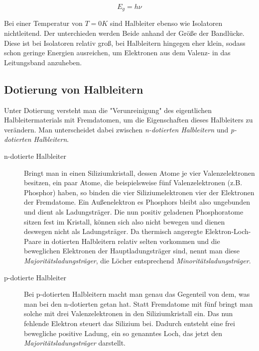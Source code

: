 \documentclass[slug=SZ, room=Hermann-Krone-Bau\,\ Labor\ 1.25,
supervisor=Martin\ Kroll, coursedate=14.\ 11.\ 2019]{../../Lab_Report_LaTeX/lab_report}
\begin{document}
\begin{equation}\label{eq:bandenenergie}
        E_g = h\nu
\end{equation}

Bei einer Temperatur von \(T=0 K\) sind Halbleiter ebenso wie
Isolatoren nichtleitend.  Der unterchieden werden Beide anhand der
Größe der Bandlücke. Diese ist bei Isolatoren relativ groß, bei
Halbleitern hingegen eher klein, sodass schon geringe Energien
ausreichen, um Elektronen aus dem Valenz- in das Leitungsband
anzuheben.


\subsection{Dotierung von Halbleitern}
\label{sec:dotierung}

Unter Dotierung versteht man die "Verunreinigung" des eigentlichen Halbleitermaterials mit Fremdatomen, um
die Eigenschaften dieses Halbleiters zu verändern.
Man unterscheidet dabei zwischen \emph{n-dotierten Halbleitern} und \emph{p-dotierten Halbleitern}.

\begin{description}

        \item[n-dotierte Halbleiter]
        Bringt man in einen Siliziumkristall, dessen Atome je vier Valenzelektronen
        besitzen, ein paar Atome, die beispielsweise fünf Valenzelektronen (z.B. Phosphor) haben, so binden die
        vier Siliziumelektronen vier der Elektronen der Fremdatome. Ein Außenelektron es Phosphors bleibt also
        ungebunden und dient als Ladungsträger. Die nun positiv geladenen Phosphoratome sitzen fest im Kristall,
        können sich also nicht bewegen und dienen deswegen nicht als Ladungsträger.
        Da thermisch angeregte Elektron-Loch-Paare in dotierten Halbleitern relativ selten vorkommen und die
        beweglichen Elektronen der Hauptladungsträger sind, nennt man diese \emph{Majoritätsladungsträger}, die
        L\"ocher entsprechend \emph{Minoritätsladungsträger}.

        \item[p-dotierte Halbleiter]
        Bei p-dotierten Halbleitern macht man genau das Gegenteil von dem, was man
        bei den n-dotierten getan hat. Statt Fremdatome mit fünf bringt man solche mit drei Valenzelektronen
        in den Siliziumkristall ein. Das nun fehlende Elektron steuert das Silizium bei. Dadurch entsteht eine
        frei bewegliche positive Ladung, ein so genanntes Loch, das jetzt den \emph{Majoritätsladungsträger}
        darstellt.

\end{description}
\end{document}
